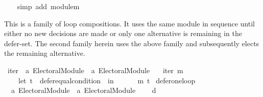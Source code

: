 \begin{isabellebody}
%
\isadelimproof
\ \ %
\endisadelimproof
%
\isatagproof
{}\isamarkupfalse%
\ {\isacharparenleft}{\kern0pt}simp\ add{\isacharcolon}{\kern0pt}\ module{\isacharunderscore}{\kern0pt}m{\isacharparenright}{\kern0pt}%
\endisatagproof
{\isafoldproof}%
%
\isadelimproof
%
\endisadelimproof
%
\isadelimdocument
%
\endisadelimdocument
%
\isatagdocument
%
\isamarkuptrue%
%
\endisatagdocument
{\isafolddocument}%
%
\isadelimdocument
%
\endisadelimdocument
%
\begin{isamarkuptext}%
This is a family of loop compositions. It uses the same module in sequence
until either no new decisions are made or only one alternative is remaining
in the defer-set. The second family herein uses the above family and
subsequently elects the remaining alternative.%
\end{isamarkuptext}\isamarkuptrue%
%
\isadelimdocument
%
\endisadelimdocument
%
\isatagdocument
%
\isamarkuptrue%
%
\endisatagdocument
{\isafolddocument}%
%
\isadelimdocument
%
\endisadelimdocument
{}\isamarkupfalse%
\ iter\ {\isacharcolon}{\kern0pt}{\isacharcolon}{\kern0pt}\ {\isachardoublequoteopen}{\isacharprime}{\kern0pt}a\ Electoral{\isacharunderscore}{\kern0pt}Module\ {\isasymRightarrow}\ {\isacharprime}{\kern0pt}a\ Electoral{\isacharunderscore}{\kern0pt}Module{\isachardoublequoteclose}\ \isanewline
\ \ {\isachardoublequoteopen}iter\ m\ {\isacharequal}{\kern0pt}\isanewline
\ \ \ \ {\isacharparenleft}{\kern0pt}let\ t\ {\isacharequal}{\kern0pt}\ defer{\isacharunderscore}{\kern0pt}equal{\isacharunderscore}{\kern0pt}condition\ {}\ in\isanewline
\ \ \ \ \ \ {\isacharparenleft}{\kern0pt}m\ {\isasymcirclearrowleft}\isactrlsub t{\isacharparenright}{\kern0pt}{\isacharparenright}{\kern0pt}{\isachardoublequoteclose}\isanewline
\isanewline
{}\isamarkupfalse%
\ defer{\isacharunderscore}{\kern0pt}one{\isacharunderscore}{\kern0pt}loop\ {\isacharcolon}{\kern0pt}{\isacharcolon}{\kern0pt}\isanewline
\ \ {\isachardoublequoteopen}{\isacharprime}{\kern0pt}a\ Electoral{\isacharunderscore}{\kern0pt}Module\ {\isasymRightarrow}\ {\isacharprime}{\kern0pt}a\ Electoral{\isacharunderscore}{\kern0pt}Module{\isachardoublequoteclose}\isanewline
\ \ \ \ {\isacharparenleft}{\kern0pt}{\isachardoublequoteopen}{\isacharunderscore}{\kern0pt}{\isasymcirclearrowleft}\isactrlsub {\isasymexists}\isactrlsub {\isacharbang}{\kern0pt}\isactrlsub d{\isachardoublequoteclose}\ {}{}{\isacharparenright}{\kern0pt}\ \isanewline

\end{isabellebody}
